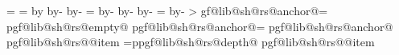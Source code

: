 {{                    \pgf@x=\pgf@xa%
                \fi%
                \ifdim\pgf@ya>\pgfutil@tempdima%
                    \pgfutil@tempdima=\pgf@ya%
                \fi%
                \ifdim\pgf@yb>\pgfutil@tempdimb%
                    \pgfutil@tempdimb=\pgf@yb%
                \fi%
                \pgf@yc=\pgfutil@tempdima%
                \advance\pgf@yc by\pgfutil@tempdimb%
                \ifdim\pgf@yc>\pgf@y%
                    \pgf@y=\pgf@yc%
                \fi%
        \repeatpgfmathloop%
        \edef\pgf@lib@sh@rs@max@width{\the\pgf@x}%
        \edef\pgf@lib@sh@rs@max@totalheight{\the\pgf@y}%
        \pgfmathsetlength{}%
        \advance\pgf@x by-\innerxsep\relax%
        \advance\pgf@x by-\innerxsep\relax%
        \pgf@xa=\pgf@x%
        \advance\pgf@xa by-\pgf@lib@sh@rs@max@width\relax%
        \ifdim\pgf@xa>0pt\relax%
            \edef\pgf@lib@sh@rs@max@width{\the\pgf@x}%
        \fi%
        \pgfmathsetlength{}%
        \advance\pgf@y by-\innerysep\relax%
        \advance\pgf@y by-\innerysep\relax%
        \pgf@ya=\pgf@y%
        \advance\pgf@ya by-\pgf@lib@sh@rs@max@totalheight\relax%
        \ifdim\pgf@ya>0pt\relax%
            \edef\pgf@lib@sh@rs@max@totalheight{\the\pgf@y}%
        \fi%
        \ifpgfrectanglesplithorizontal%
            \pgf@x=0pt\relax%
            \pgfmathloop%
                \ifnum\pgfmathcounter>\parts%
                \else%
                    \pgf@lib@sh@getalpha\pgf@lib@sh@rs@number{\pgfmathcounter}%
                    \expandafter\let\csname pgf@lib@sh@rs@anchor@\pgf@lib@sh@rs@number\endcsname=\pgfutil@empty%
                    \expandafter\ifx\csname pgf@lib@sh@rs@empty@\pgf@lib@sh@rs@number\endcsname\pgfutil@empty%
                        \ifpgfrectanglesplitignoreemptyparts%
                            \expandafter\let\csname pgf@lib@sh@rs@anchor@\pgf@lib@sh@rs@number\endcsname=%
                                \pgf@lib@sh@rs@lastanchor%
                        \fi%
                    \fi%
                    \expandafter\ifx\csname pgf@lib@sh@rs@anchor@\pgf@lib@sh@rs@number\endcsname\pgfutil@empty%
                        \expandafter\ifx\csname pgf@lib@sh@rs@\pgf@lib@sh@rs@number @item\endcsname%
                                \pgf@lib@sh@rs@bottomtext%
                            \pgf@y=\csname pgf@lib@sh@rs@depth@\pgf@lib@sh@rs@number\endcsname\relax%
                        \else%
                            \expandafter\ifx\csname pgf@lib@sh@rs@\pgf@lib@sh@rs@number @item\endcsname%
}}

